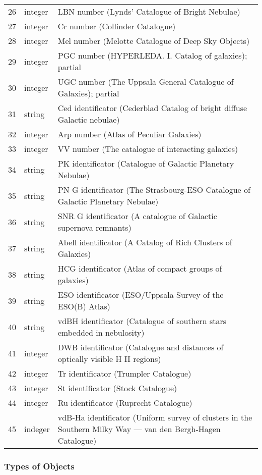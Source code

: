 \begin{longtable}{r|l|p{110mm}}
26 & integer & LBN number (Lynds' Catalogue of Bright Nebulae)\\
27 & integer & Cr  number (Collinder Catalogue)\\
28 & integer & Mel number (Melotte Catalogue of Deep Sky Objects)\\
29 & integer & PGC number (HYPERLEDA. I. Catalog of galaxies); partial\\
30 & integer & UGC number (The Uppsala General Catalogue of Galaxies); partial\\
31 & string  & Ced identificator (Cederblad Catalog of bright diffuse Galactic nebulae)\\
32 & integer & Arp number (Atlas of Peculiar Galaxies)\\
33 & integer & VV number (The catalogue of interacting galaxies)\\
34 & string  & PK identificator (Catalogue of Galactic Planetary Nebulae)\\
35 & string  & PN G identificator (The Strasbourg-ESO Catalogue of Galactic Planetary Nebulae)\\
36 & string  & SNR G identificator (A catalogue of Galactic supernova remnants)\\
37 & string  & Abell identificator (A Catalog of Rich Clusters of Galaxies)\\
38 & string  & HCG identificator (Atlas of compact groups of galaxies)\\
39 & string  & ESO identificator (ESO/Uppsala Survey of the ESO(B) Atlas)\\
40 & string  & vdBH identificator (Catalogue of southern stars embedded in nebulosity)\\
41 & integer & DWB identificator (Catalogue and distances of optically visible H II regions)\\
42 & integer & Tr identificator (Trumpler Catalogue)\\
43 & integer & St identificator (Stock Catalogue)\\
44 & integer & Ru identificator (Ruprecht Catalogue)\\
45 & indeger & vdB-Ha identificator (Uniform survey of clusters in the Southern Milky Way --- van den Bergh-Hagen Catalogue)\\
\bottomrule
\end{longtable}

\subsubsection{Types of Objects}
\label{sec:dso:types}

